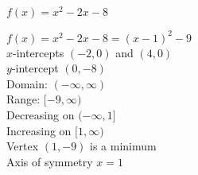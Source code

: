 {$f(x) =x^{2} - 2x - 8$}
{$f(x) = x^{2} - 2x - 8 = (x - 1)^{2} - 9$\\
$x$-intercepts $(-2, 0)$ and $(4, 0)$\\
$y$-intercept $(0, -8)$\\
Domain: $(-\infty, \infty)$ \\
Range: $[-9, \infty)$ \\
Decreasing on $(-\infty, 1]$ \\
Increasing on $[1, \infty)$ \\
Vertex $(1, -9)$ is a minimum \\
Axis of symmetry $x = 1$

\begin{center}
\end{center}
}